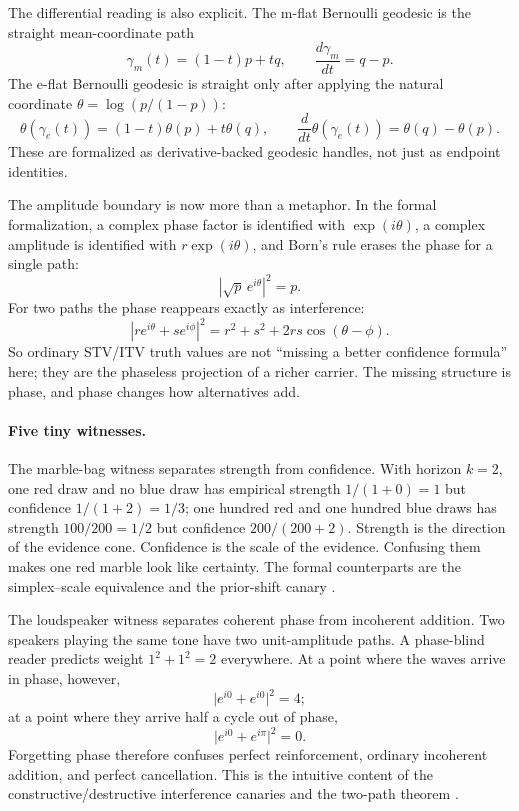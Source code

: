 \documentclass[11pt,openany]{report}
\begin{document}
The differential reading is also explicit.  The m-flat Bernoulli
geodesic is the straight mean-coordinate path
\[
  \gamma_m(t)=(1-t)p+tq,
  \qquad
  \frac{d\gamma_m}{dt}=q-p .
\]
The e-flat Bernoulli geodesic is straight only after applying the
natural coordinate $\theta=\log(p/(1-p))$:
\[
  \theta(\gamma_e(t))=(1-t)\theta(p)+t\theta(q),
  \qquad
  \frac{d}{dt}\theta(\gamma_e(t))=\theta(q)-\theta(p).
\]
These are formalized as derivative-backed geodesic handles, not just
as endpoint identities.

The amplitude boundary is now more than a metaphor.  In the formal
formalization, a complex phase factor is identified with $\exp(i\theta)$, a
complex amplitude is identified with $r\exp(i\theta)$, and Born's rule
erases the phase for a single path:
\[
  \left\lvert \sqrt{p}\,e^{i\theta}\right\rvert^2 = p .
\]
For two paths the phase reappears exactly as interference:
\[
  \left\lvert r e^{i\theta} + s e^{i\phi}\right\rvert^2
  = r^2 + s^2 + 2rs\cos(\theta-\phi).
\]
So ordinary STV/ITV truth values are not ``missing a better confidence
formula'' here; they are the phaseless projection of a richer carrier.
The missing structure is phase, and phase changes how alternatives add.

\paragraph{Five tiny witnesses.}
The marble-bag witness separates strength from confidence.  With
horizon $k=2$, one red draw and no blue draw has empirical strength
$1/(1+0)=1$ but confidence $1/(1+2)=1/3$; one hundred red and one
hundred blue draws has strength $100/200=1/2$ but confidence
$200/(200+2)$.  Strength is the direction of the evidence cone.
Confidence is the scale of the evidence.  Confusing them makes one red
marble look like certainty.  The formal counterparts are the
simplex--scale equivalence
 and the prior-shift canary
.

The loudspeaker witness separates coherent phase from incoherent
addition.  Two speakers playing the same tone have two unit-amplitude
paths.  A phase-blind reader predicts weight $1^2+1^2=2$ everywhere.
At a point where the waves arrive in phase, however,
\[
  \lvert e^{i0}+e^{i0}\rvert^2 = 4;
\]
at a point where they arrive half a cycle out of phase,
\[
  \lvert e^{i0}+e^{i\pi}\rvert^2 = 0.
\]
Forgetting phase therefore confuses perfect reinforcement, ordinary
incoherent addition, and perfect cancellation.  This is the intuitive
content of the constructive/destructive interference canaries and the
two-path theorem
.
\end{document}
